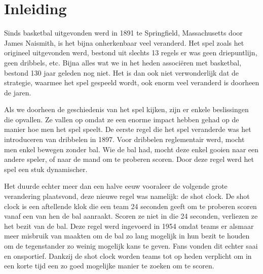 \documentclass{hogent-article}
\affiliation{
  \textsuperscript{1} \href{mailto:vincent.vandeperre@student.hogent.be}{vincent.vandeperre@student.hogent.be}}
\date{\today}
\begin{document}
\flushbottom %
\maketitle %
\tableofcontents %
\thispagestyle{empty} %


\section{Inleiding}
Sinds basketbal uitgevonden werd in 1891 te Springfield, Massachusetts door James Naismith, is het bijna onherkenbaar veel veranderd. Het spel zoals het origineel uitgevonden werd, bestond uit slechts 13 regels er was geen driepuntlijn, geen dribbels, etc. Bijna alles wat we in het heden associëren met basketbal, bestond 130 jaar geleden nog niet. Het is dan ook niet verwonderlijk dat de strategie, waarmee het spel gespeeld wordt, ook enorm veel veranderd is doorheen de jaren.

Als we doorheen de geschiedenis van het spel kijken, zijn er enkele beslissingen die opvallen. Ze vallen op omdat ze een enorme impact hebben gehad op de manier hoe men het spel speelt. De eerste regel die het spel veranderde was het introduceren van dribbelen in 1897. Voor dribbelen reglementair werd, mocht men enkel bewegen zonder bal. Wie de bal had, mocht deze enkel gooien naar een andere speler, of naar de mand om te proberen scoren. Door deze regel werd het spel een stuk dynamischer.

Het duurde echter meer dan een halve eeuw vooraleer de volgende grote verandering plaatsvond, deze nieuwe regel was namelijk: de shot clock. De shot clock is een aftellende klok die een team 24 seconden geeft om te proberen scoren vanaf een van hen de bal aanraakt. Scoren ze niet in die 24 seconden, verliezen ze het bezit van de bal. Deze regel werd ingevoerd in 1954 omdat teams er alsmaar meer misbruik van maakten om de bal zo lang mogelijk in hun bezit te houden om de tegenstander zo weinig mogelijk kans te geven. Fans vonden dit echter saai en onsportief. Dankzij de shot clock worden teams tot op heden verplicht om in een korte tijd een zo goed mogelijke manier te zoeken om te scoren.
\end{document}
